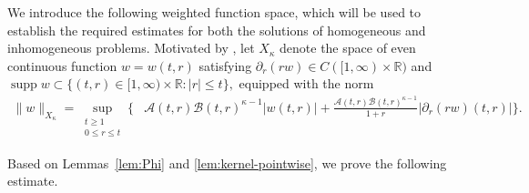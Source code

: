 \documentclass[11pt,twoside]{article}
\newcommand{\supp}{\operatorname{supp}}
\newcommand{\R}{\mathbb R}
\newcommand{\p}{\partial}
\newcommand{\f}{\frac}
\newcommand{\Acal}{\mathcal A}
\newcommand{\Bcal}{\mathcal B}
\theoremstyle{plain}
\theoremstyle{definition}
\theoremstyle{remark}
\numberwithin{equation}{section}
\begin{document}
We introduce the following weighted function space, which will be used
to establish the required estimates for both the solutions of homogeneous and inhomogeneous problems.
Motivated by \cite{Rei1}, let $X_\kappa$ denote the space
of even continuous function $w=w(t,r)$ satisfying
$\partial_r(rw)\in C([1,\infty)\times\mathbb R)$
and
$\supp w\subset
\{(t,r)\in[1,\infty)\times\R:|r|\leq t\},$
equipped with the norm
\begin{equation}\label{eq:Xkappa}
\begin{aligned}
\|w\|_{X_\kappa}
=\sup_{\substack{t\geq1\\0\leq r\leq t}}
\big\{
&\Acal(t,r)\Bcal(t,r)^{\kappa-1}|w(t,r)|+
\f{\Acal(t,r)\Bcal(t,r)^{\kappa-1}}{1+r}
\left|\p_r(rw)(t,r)\right|
\big\}.
\end{aligned}
\end{equation}

Based on Lemmas~\ref{lem:Phi} and \ref{lem:kernel-pointwise}, we
prove the following estimate.
\end{document}
